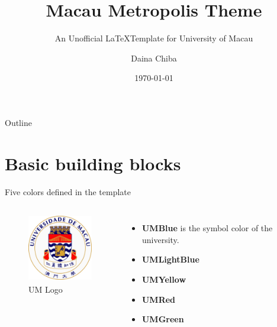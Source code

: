 \documentclass[12pt]{beamer}
\title{Macau Metropolis Theme}
\subtitle{An Unofficial \LaTeX \space Template for University of Macau}
\date{\today}
\author{Daina Chiba}
\institute{University of Macau}
\begin{document}
\maketitle %
\begin{frame}[plain]{Outline} %
	\tableofcontents
\end{frame}



\section{Basic building blocks}


\begin{frame}{{\color{UMYellow} Five colors} defined in the template}
\begin{columns}
    	\begin{figure}
        \centering
        \includegraphics[height=3cm]{figures/UMlogo.png}
        \caption{UM Logo}
        \end{figure}
        \begin{itemize}
        \item {\color{UMBlue}\bf UMBlue} is the symbol color of the university.
        \item {\color{UMLightBlue}\bf UMLightBlue}
        \item {\color{UMYellow}\bf UMYellow}
		\item {\color{UMRed}\bf UMRed}
		\item {\color{UMGreen}\bf UMGreen}
        \end{itemize}
	\end{columns} 
\end{frame}


{
\begin{frame}

 \color{UMYellow}{\bf\Large Use UMBlue as background color.}

\end{frame}
}
\end{document}
